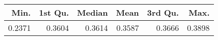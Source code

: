 \begin{table}[ht]
\centering
\begin{tabular}{rrrrrr}
  \hline
Min. & 1st Qu. & Median & Mean & 3rd Qu. & Max. \\ 
  \hline
0.2371 & 0.3604 & 0.3614 & 0.3587 & 0.3666 & 0.3898 \\ 
   \hline
\end{tabular}
\end{table}

